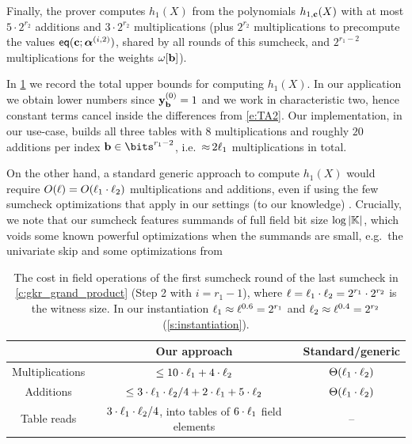 \documentclass[11pt,letterpaper,usenames,dvipsnames]{article}
\begin{document}
 Finally, the prover computes $h_1(X)$ from the polynomials $h_{1,\mathbf{c}}(X)$ with at most $5\cdot 2^{r_2}$ additions and $3\cdot 2^{r_2}$ multiplications (plus $2^{r_2}$ multiplications to precompute the values $\mathsf{eq}(\mathbf{c};\bm{\alpha}^{(i,2)})$, shared by all rounds of this sumcheck, and $2^{r_1-2}$ multiplications for the weights $\omega[\mathbf{b}]$).
 
\bigskip

In \cref{t:gkr_step1_costs} we record the total upper bounds for computing $h_1(X)$. In our application we obtain lower numbers since $\mathbf{y}_{\mathbf{b}}^{(0)}=1$ and we work in characteristic two, hence  constant terms cancel inside the differences from \cref{e:TA2}.  Our implementation, in our use-case, builds all three tables with $8$ multiplications and roughly $20$ additions per index $\bb\in \bits^{r_1-2}$, i.e.\ ${\approx}\,2\ell_1$ multiplications in total.


 On the other hand, a standard generic approach to compute $h_{1}(X)$ would require $O(\ell)=O(\ell_1\cdot \ell_2)$ multiplications and additions, even if using the few  sumcheck optimizations that apply in our settings (to our knowledge) . Crucially, we note that our sumcheck features summands of full field bit size $\log|\mathbb{K}|$, which voids some known powerful optimizations when the summands are small, e.g.\ the univariate skip \cite{?} and some optimizations from \cite{?} 


\begin{table}[H]
    \centering
    \begin{tabular}{c|c|c}
         & Our approach & Standard/generic \\
         \hline
        Multiplications & $\leq   10\cdot \ell_1 +  4\cdot \ell_2 $ &$\Theta(\ell_1\cdot \ell_2)$\\
        \hline
        Additions & $\leq 3\cdot \ell_1\cdot \ell_2/4 + 2\cdot\ell_1 +  5\cdot \ell_2$  & $\Theta(\ell_1\cdot \ell_2)$\\
        \hline
        Table reads & $3\cdot \ell_1\cdot \ell_2/4$, into tables of $6\cdot\ell_1$ field elements & --
    \end{tabular}
    \caption{The cost in field operations of the first sumcheck round of the last sumcheck in \cref{c:gkr_grand_product} (Step 2 with $i=r_1-1$), where $\ell=\ell_1\cdot \ell_2 = 2^{r_1}\cdot 2^{r_2}$ is the witness size. In our instantiation $\ell_1\approx \ell^{0.6} = 2^{r_1}$ and $\ell_2\approx \ell^{0.4}=2^{r_2}$ (\cref{s:instantiation}). %
    }
\label{t:gkr_step1_costs}
\end{table}
\end{document}
